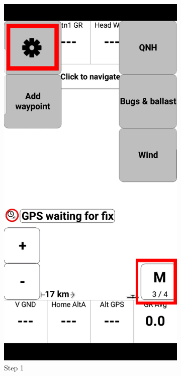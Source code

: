 \documentclass{article}
\begin{document}
\begin{figure}[h!]
\begin{subfigure}[b]{0.24\linewidth}
            \includegraphics[width=\linewidth]{images/Tophat-1.jpg}
            \caption{Step 1}
        \end{subfigure}
        \begin{subfigure}[b]{0.24\linewidth}

\end{subfigure}
\end{figure}
\end{document}
